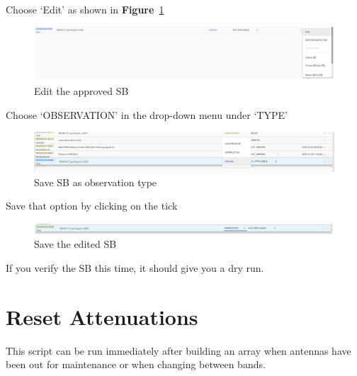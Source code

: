 Choose ‘Edit’ as shown in \textbf{Figure}~\ref{fig:image31}
\begin{figure}[H]
	\centering
	\includegraphics[scale=0.25]{Chapters/images/image31.png}
	
	\caption{Edit the approved SB}
	\label{fig:image31}
\end{figure}


Choose ‘OBSERVATION’ in the drop-down menu under ‘TYPE’

\begin{figure}[H]
	\centering
	\includegraphics[scale=0.37]{Chapters/images/image53.png}
	
	\caption{Save SB as observation type}
	\label{fig:image53}
\end{figure}


Save that option by clicking on the tick



\begin{figure}[!thb]
	\centering
	\includegraphics[scale=0.4]{Chapters/images/ManualSB.png}
	
	\caption{Save the edited SB }
	\label{fig:ManualSB}
\end{figure}

If you verify the SB this time, it should give you a dry run.

\section{Reset Attenuations}

This script can be run immediately after building an array when antennas have been out for maintenance or when changing between bands.

